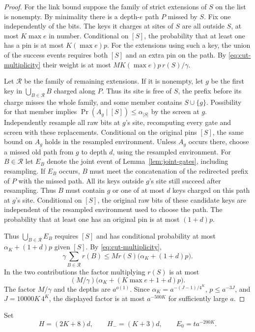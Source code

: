 \begin{proof}
For the link bound suppose the family of strict extensions of $S$ on the
list is nonempty. By minimality there is a depth-$e$ path $P$ missed by
$S$. Fix one independently of the bits. The keys it charges at sites of
$S$ are all outside $S$, at most $K\max e$ in number. Conditional on
$[S]$, the probability that at least one has a pin is at most
$K(\max e)p$. For the extensions using such a key, the union of the success events
requires both $[S]$ and an extra pin on the path. By
\eqref{eq:cut-multiplicity} their weight is at most
$M K(\max e)p\,r(S)/\gamma$.

Let $\mathcal R$ be the family of remaining extensions. If it is
nonempty, let $g$ be the first key in $\bigcup_{B\in\mathcal R}B$
charged along $P$. Thus its site is free of $S$, the prefix
before its charge misses the whole family, and some member contains
$S\cup\{g\}$. Possibility for that member implies
$\Pr(A_g\mid[S])\le\alpha_{|S|}$ by the screen at $g$.
Independently resample all raw bits at $g$'s site, recomputing every
gate and screen with these replacements. Conditional on the
original pins $[S]$, the same bound on $A_g$ holds in the resampled
environment. Unless $A_g$ occurs there, choose a missed old path from
$g$ to depth $d$, using the resampled environment. For $B\in\mathcal R$
let $E_B$ denote the joint event of Lemma~\ref{lem:joint-gates},
including resampling. If $E_B$ occurs, $B$ must meet the concatenation
of the redirected prefix of $P$ with the missed path. All its keys outside
$g$'s site still succeed after resampling. Thus $B$ must contain $g$ or
one of at most $d$ keys charged on this path at $g$'s site. Conditional
on $[S]$, the original raw bits of these candidate keys are independent
of the resampled environment used to choose the path. The probability
that at least one has an original pin is at most $(1+d)p$.

Thus $\bigcup_{B\in\mathcal R}E_B$ requires $[S]$ and has conditional
probability at most $\alpha_K+(1+d)p$ given $[S]$. By
\eqref{eq:cut-multiplicity},
\[
 \gamma\sum_{B\in\mathcal R}r(B)
 \le M r(S)\bigl(\alpha_K+(1+d)p\bigr).
\]
In the two contributions the factor multiplying \(r(S)\) is at most
\[
  (M/\gamma)\bigl(\alpha_K+(K\max e+1+d)p\bigr).
\]
The factor \(M/\gamma\) and the depths are \(a^{o(1)}\).
Since \(\alpha_K=a^{-(J-1)/4^K}\), \(p\le a^{-3J}\), and
\(J=10000K\,4^K\), the displayed factor is at most \(a^{-500K}\)
for sufficiently large \(a\).
\end{proof}

Set
\begin{equation}\label{eq:cut-depths}
 H=(2K+8)d,\qquad H_-=(K+3)d,\qquad E_0=t a^{-200K}.
\end{equation}

